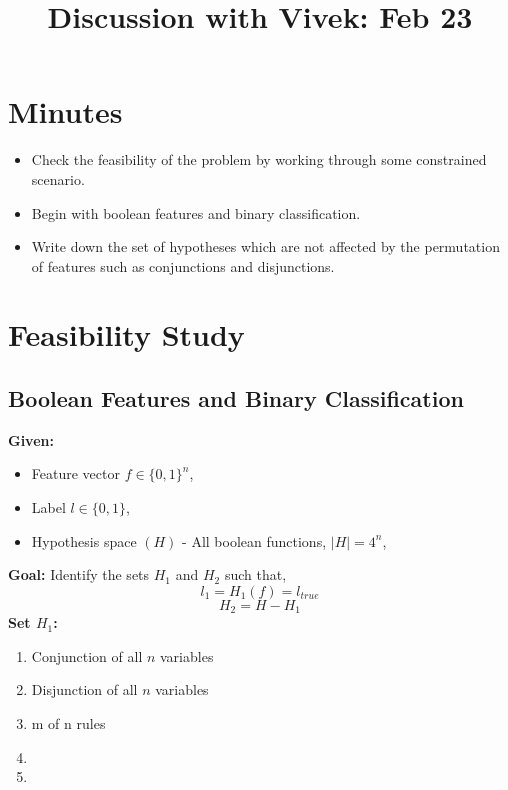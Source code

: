 \documentclass[]{article}
\title{Discussion with Vivek: Feb 23}
\begin{document}
\maketitle

\section{Minutes}
\begin{itemize}
\item Check the feasibility of the problem by working through some constrained scenario.
\item Begin with boolean features and binary classification.
\item Write down the set of hypotheses which are not affected by the permutation of features such as conjunctions and disjunctions.
\end{itemize}

\section{Feasibility Study}

\subsection{Boolean Features and Binary Classification}
\textbf{Given:} 
\begin{itemize}
\item Feature vector $f \in \{0, 1\}^n$, 
\item Label $l \in \{0, 1\}$, 
\item Hypothesis space $(H)$ - All boolean functions, $|H| = 4^n$,
\end{itemize}
\noindent \textbf{Goal:} Identify the sets $H_1$ and $H_2$ such that,
\[l_1 = H_1(f) = l_{true}\]
\[ H_2 = H - H_1 \]
\noindent \textbf{Set $H_1$:}
\begin{enumerate}
\item Conjunction of all $n$ variables

\item Disjunction of all $n$ variables

\item m of n rules

\item

\item

\end{enumerate}
\end{document}
